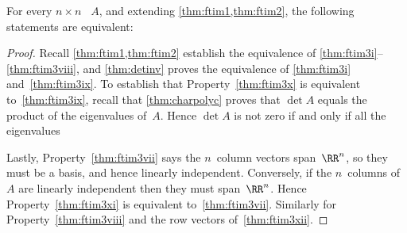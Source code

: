 \begin{theorem} \label{thm:ftim3} 
For every \(n\times n\) ~\(A\), and  
extending \cref{thm:ftim1,thm:ftim2}, the following statements are equivalent:
\end{theorem}
\begin{proof} 
Recall \cref{thm:ftim1,thm:ftim2} establish the equivalence of \ref{thm:ftim3i}--\ref{thm:ftim3viii}, and \cref{thm:detinv} proves the equivalence of \ref{thm:ftim3i} and~\ref{thm:ftim3ix}.
To establish that Property~\ref{thm:ftim3x} is equivalent to~\ref{thm:ftim3ix}, recall that \cref{thm:charpolyc} proves that \(\det A\) equals the product of the eigenvalues of~\(A\). 
Hence  \(\det A\) is not zero if and only if all the eigenvalues 

Lastly, Property~\ref{thm:ftim3vii} says the \(n\)~column vectors span~\(\RR^n\), so they must be a basis, and hence linearly independent.
Conversely, if the \(n\)~columns of~\(A\) are linearly independent then they must span~\(\RR^n\).  
Hence Property~\ref{thm:ftim3xi} is equivalent to~\ref{thm:ftim3vii}.
Similarly  for Property~\ref{thm:ftim3viii} and the row vectors of~\ref{thm:ftim3xii}.
\end{proof}


